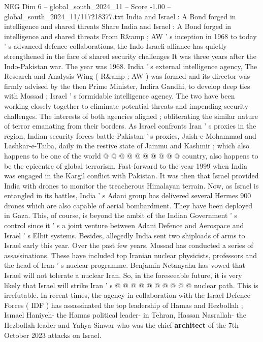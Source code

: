 \begin{textsample}{NEG Dim 6 – global\_south\_2024\_11 – Score -1.00 – global\_south\_2024\_11/117218377.txt}  \label{ex:f6_neg_114}
India and Israel : A Bond forged in intelligence and shared threats Share India and Israel : A Bond forged in intelligence and shared threats From R\&amp ; AW ' s inception in 1968 to today ' s advanced defence collaborations, the Indo-Israeli alliance has quietly strengthened in the face of shared security challenges It was three years after the Indo-Pakistan war.
The year was 1968.
India ' s external intelligence agency, The Research and Analysis Wing ( R\&amp ; AW ) was formed and its director was firmly advised by the then Prime Minister, Indira Gandhi, to develop deep ties with Mossad ; Israel ' s formidable intelligence agency.
The two have been working closely together to eliminate potential threats and impending security challenges.
The interests of both agencies aligned ; obliterating the similar nature of terror emanating from their borders.
As Israel confronts Iran ' s proxies in the region, Indian security forces battle Pakistan ' s proxies, Jaish-e-Mohammad and Lashkar-e-Taiba, daily in the restive state of Jammu and Kashmir ; which also happens to be one of the world @ @ @ @ @ @ @ @ @ @ country, also happens to be the epicentre of global terrorism.
Fast-forward to the year 1999 when India was engaged in the Kargil conflict with Pakistan.
It was then that Israel provided India with drones to monitor the treacherous Himalayan terrain.
Now, as Israel is entangled in its battles, India ' s Adani group has delivered several Hermes 900 drones which are also capable of aerial bombardment.
They have been deployed in Gaza.
This, of course, is beyond the ambit of the Indian Government ' s control since it ' s a joint venture between Adani Defence and Aerospace and Israel ' s Elbit systems.
Besides, allegedly India sent two shiploads of arms to Israel early this year.
Over the past few years, Mossad has conducted a series of assassinations.
These have included top Iranian nuclear physicists, professors and the head of Iran ' s nuclear programme.
Benjamin Netanyahu has vowed that Israel will not tolerate a nuclear Iran.
So, in the foreseeable future, it is very likely that Israel will strike Iran ' s @ @ @ @ @ @ @ @ @ @ nuclear path.
This is irrefutable.
In recent times, the agency in collaboration with the Israel Defence Forces ( IDF ) has assassinated the top leadership of Hamas and Hezbollah ; Ismael Haniyeh- the Hamas political leader- in Tehran, Hassan Nasrallah- the Hezbollah leader and Yahya Sinwar who was the chief \textbf{architect} of the 7th October 2023 attacks on Israel.

\end{textsample}
